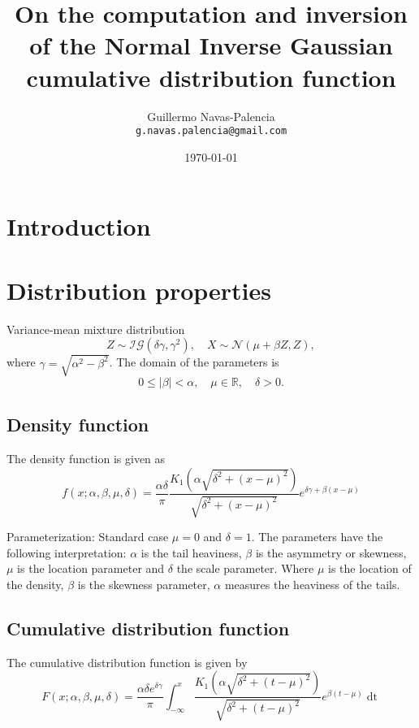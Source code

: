 \documentclass[10pt,a4paper,oneside]{article}
\title{On the computation and inversion of the Normal Inverse Gaussian cumulative distribution function}
\author{
 \normalsize  Guillermo Navas-Palencia\\
  \texttt{\normalsize  g.navas.palencia@gmail.com}
}
\date{\small \today}
\numberwithin{equation}{section}
\begin{document}
\maketitle

\tableofcontents
\newpage
\section{Introduction}

\section{Distribution properties}

Variance-mean mixture distribution
\begin{equation}
Z \sim \mathcal{IG}(\delta \gamma, \gamma^2), \quad X \sim \mathcal{N}(\mu + \beta Z, Z),
\end{equation}
where $\gamma = \sqrt{\alpha^2 - \beta^2}$. The domain of the parameters is
\begin{equation}
0 \le |\beta| < \alpha, \quad \mu \in \mathbb{R}, \quad \delta  > 0.
\end{equation}

\subsection{Density function}
The density function is given as
\begin{equation}
f(x; \alpha, \beta, \mu, \delta) = \frac{\alpha \delta}{\pi} \frac{K_1\left(\alpha\sqrt{\delta^2 + (x-\mu)^2}\right)}{\sqrt{\delta^2 + (x-\mu)^2}} e^{\delta \gamma + \beta(x-\mu)}
\end{equation}

Parameterization: Standard case $\mu = 0$ and $\delta = 1$. The parameters have the following interpretation: $\alpha$ is the tail heaviness, $\beta$ is the asymmetry or skewness, $\mu$ is the location parameter and $\delta$ the scale parameter. Where $\mu$ is the location of the density, $\beta$ is the skewness parameter, $\alpha$ measures the heaviness of the tails.

\subsection{Cumulative distribution function}
The cumulative distribution function is given by
\begin{equation}\label{integral_k1}
F(x; \alpha, \beta, \mu, \delta) = \frac{\alpha \delta e^{\delta \gamma}}{\pi} \int_{-\infty}^{x} \frac{K_1\left(\alpha\sqrt{\delta^2 + (t-\mu)^2}\right)}{\sqrt{\delta^2 + (t-\mu)^2}} e^{\beta(t-\mu)} \mathop{dt}
\end{equation}
\end{document}
